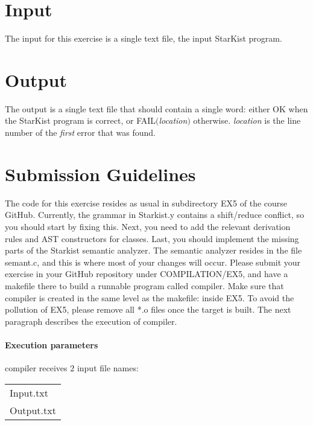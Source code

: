 \documentclass{article}
\begin{document}
\section{Input}
The input for this exercise is a single text file, the input StarKist program.

\section{Output}
The output is a single text file that should contain a single word:
either OK when the StarKist program is correct, or FAIL$($\textit{location}$)$ otherwise.
\textit{location} is the line number of the \textit{first} error that was found.

\section{Submission Guidelines}
The code for this exercise resides as usual in subdirectory EX5 of the course GitHub.
Currently, the grammar in Starkist.y contains a shift/reduce conflict,
so you should start by fixing this.
Next, you need to add the relevant derivation rules and AST constructors
for classes. Last, you should implement the missing parts of the Starkist semantic analyzer.
The semantic analyzer resides in the file semant.c, and this is where
most of your changes will occur.
Please submit your exercise in your GitHub repository under COMPILATION/EX5,
and have a makefile there to build a runnable program called compiler.
Make sure that compiler is created in the same level as the makefile: inside EX5.
To avoid the pollution of EX5, please remove all *.o files once the target is built.
The next paragraph describes the execution of compiler.

\paragraph{Execution parameters}
compiler receives $2$ input file names:
\begin{table}[h]
\centering
\begin{tabular}{ l }
  Input.txt  \\
  Output.txt \\
\end{tabular}
\end{table}
\end{document}
